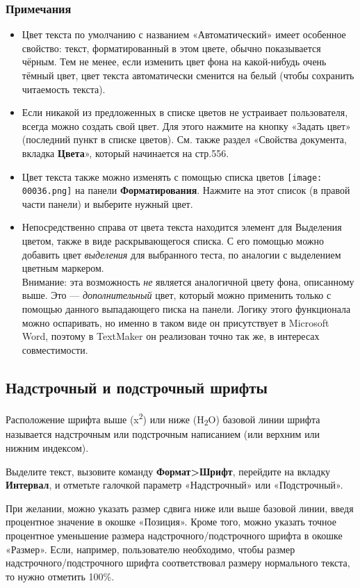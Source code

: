 \documentclass[a4paper,10pt]{article}
\begin{document}
\subsubsection{Примечания}
\begin{itemize}
 \item Цвет текста по умолчанию с названием «Автоматический» имеет особенное свойство: текст, форматированный в этом цвете, обычно показывается чёрным. Тем не менее, если изменить цвет фона на какой-нибудь очень тёмный цвет, цвет текста автоматически сменится на белый (чтобы сохранить читаемость текста).
 \item Если никакой из предложенных в списке цветов не устраивает пользователя, всегда можно создать свой цвет. Для этого нажмите на кнопку «Задать цвет» (последний пункт в списке цветов). См. также раздел «Свойства документа, вкладка \textbf{Цвета}», который начинается на стр.556.
 \item Цвет текста также можно изменять с помощью списка цветов \texttt{[image: 00036.png]} на панели \textbf{Форматирования}. Нажмите на этот список (в правой части панели) и выберите нужный цвет.
 \item Непосредственно справа от цвета текста находится элемент для Выделения цветом, также в виде раскрывающегося списка. С его помощью можно добавить цвет \textit{выделения} для выбранного теста, по аналогии с выделением цветным маркером.\\
 Внимание: эта возможность \textit{не} является аналогичной цвету фона, описанному выше. Это --- \textit{дополнительный} цвет, который можно применить только с помощью данного выпадающего писка на панели. Логику этого функционала можно оспаривать, но именно в таком виде он присутствует в Microsoft Word, поэтому в TextMaker он реализован точно так же, в интересах совместимости.
\end{itemize}

\subsection{Надстрочный и подстрочный шрифты}
Расположение шрифта выше (x\textsuperscript{2}) или ниже (H\textsubscript{2}O) базовой линии шрифта называется надстрочным или подстрочным написанием (или верхним или нижним индексом).

Выделите текст, вызовите команду \textbf{Формат>Шрифт}, перейдите на вкладку \textbf{Интервал}, и отметьте галочкой параметр «Надстрочный» или «Подстрочный».

При желании, можно указать размер сдвига ниже или выше базовой линии, введя процентное значение в окошке «Позиция». Кроме того, можно указать точное процентное уменьшение размера надстрочного/подстрочного шрифта в окошке «Размер». Если, например, пользователю необходимо, чтобы размер  надстрочного/подстрочного шрифта соответствовал размеру нормального текста, то нужно отметить 100\%.
\end{document}
